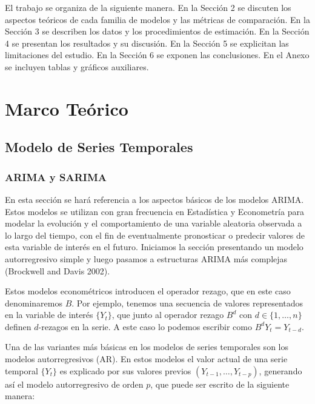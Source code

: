 \documentclass[
  12pt, a4paper, oneside]{article}
\begin{document}
El trabajo se organiza de la siguiente manera. En la Sección 2 se discuten los aspectos teóricos de cada familia de modelos y las métricas de comparación. En la Sección 3 se describen los datos y los procedimientos de estimación. En la Sección 4 se presentan los resultados y su discusión. En la Sección 5 se explicitan las limitaciones del estudio. En la Sección 6 se exponen las conclusiones. En el Anexo se incluyen tablas y gráficos auxiliares.

\section{Marco Teórico}\label{marco-teuxf3rico}

\subsection{Modelo de Series Temporales}\label{modelo-de-series-temporales}

\subsubsection{ARIMA y SARIMA}\label{arima-y-sarima}

En esta sección se hará referencia a los aspectos básicos de los modelos ARIMA. Estos modelos se utilizan con gran frecuencia en Estadística y Econometría para modelar la evolución y el comportamiento de una variable aleatoria observada a lo largo del tiempo, con el fin de eventualmente pronosticar o predecir valores de esta variable de interés en el futuro. Iniciamos la sección presentando un modelo autorregresivo simple y luego pasamos a estructuras ARIMA más complejas (Brockwell and Davis 2002).

Estos modelos econométricos introducen el operador rezago, que en este caso denominaremos \(B\). Por ejemplo, tenemos una secuencia de valores representados en la variable de interés \(\{Y_t\}\), que junto al operador rezago \(B^d\) con \(d \in \{1, \ldots, n\}\) definen \(d\)-rezagos en la serie. A este caso lo podemos escribir como \(B^d Y_t = Y_{t-d}\).

Una de las variantes más básicas en los modelos de series temporales son los modelos autorregresivos (AR). En estos modelos el valor actual de una serie temporal \(\{Y_t\}\) es explicado por sus valores previos \((Y_{t-1}, \ldots, Y_{t-p})\), generando así el modelo autorregresivo de orden \(p\), que puede ser escrito de la siguiente manera:
\end{document}
